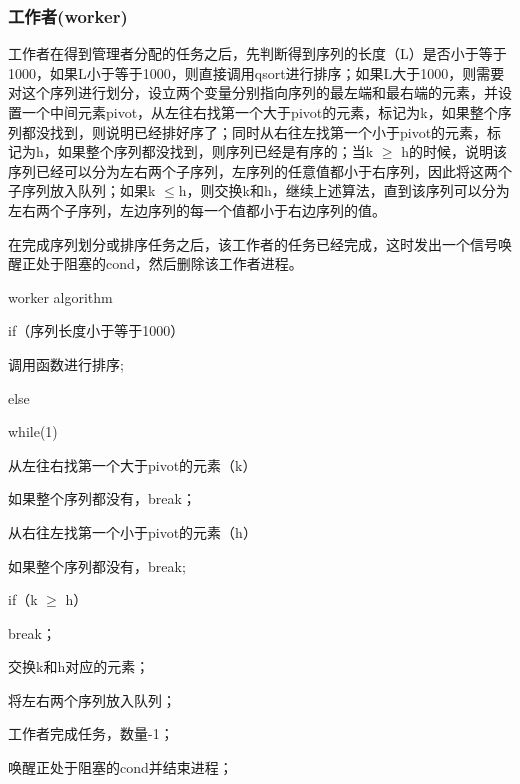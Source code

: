 \documentclass[UTF8]{ctexart}
\begin{document}
\subsubsection{工作者(worker)}
工作者在得到管理者分配的任务之后，先判断得到序列的长度（L）是否小于等于1000，如果L小于等于1000，则直接调用qsort进行排序；如果L大于1000，则需要对这个序列进行划分，设立两个变量分别指向序列的最左端和最右端的元素，并设置一个中间元素pivot，从左往右找第一个大于pivot的元素，标记为k，如果整个序列都没找到，则说明已经排好序了；同时从右往左找第一个小于pivot的元素，标记为h，如果整个序列都没找到，则序列已经是有序的；当k $\geq $ h的时候，说明该序列已经可以分为左右两个子序列，左序列的任意值都小于右序列，因此将这两个子序列放入队列；如果k $\leq $h，则交换k和h，继续上述算法，直到该序列可以分为左右两个子序列，左边序列的每一个值都小于右边序列的值。\par
在完成序列划分或排序任务之后，该工作者的任务已经完成，这时发出一个信号唤醒正处于阻塞的cond，然后删除该工作者进程。\par
\begin{algorithm}
\caption{worker algorithm}
\begin{algorithmic}[1]
\STATE if（序列长度小于等于1000）\par
\STATE	\qquad 调用函数进行排序;\par
\STATE	else	\par
\STATE	\qquad 	while(1)\par
\STATE	\qquad\qquad 从左往右找第一个大于pivot的元素（k）\par
\STATE	\qquad\qquad \qquad 如果整个序列都没有，break；\par
\STATE \qquad \qquad 从右往左找第一个小于pivot的元素（h）\par
\STATE	\qquad\qquad\qquad 如果整个序列都没有，break;\par
\STATE	\qquad\qquad if（k $\geq$ h）\par
\STATE	\qquad\qquad \qquad break；\par
\STATE	\qquad \qquad 交换k和h对应的元素；\par
\STATE	\qquad 将左右两个序列放入队列；\par
\STATE	工作者完成任务，数量-1；\par 
\STATE	唤醒正处于阻塞的cond并结束进程；\par
\end{algorithmic}
\end{algorithm}
\par
\end{document}
